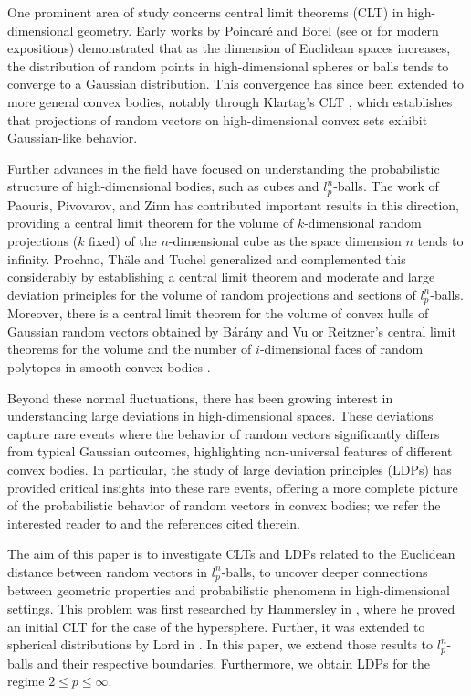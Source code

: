\documentclass[10pt]{amsart}
\newcounter{theor}
\numberwithin{equation}{section}
\begin{document}
One prominent area of study concerns central limit theorems (CLT) in high-dimensional geometry. Early works by Poincar\'e and Borel (see \cite{DF} or \cite{St} for modern expositions) demonstrated that as the dimension of Euclidean spaces increases, the distribution of random points in high-dimensional spheres or balls tends to converge to a Gaussian distribution. This convergence has since been extended to more general convex bodies, notably through Klartag's CLT \cite{K,K2}, which establishes that projections of random vectors on high-dimensional convex sets exhibit Gaussian-like behavior.

Further advances in the field have focused on understanding the probabilistic structure of high-dimensional bodies, such as cubes and  $l_p^n$-balls. The work of Paouris, Pivovarov, and Zinn \cite{PPZ} has contributed important results in this direction, providing a central limit theorem for the volume of $k$-dimensional random projections ($k$ fixed) of the $n$-dimensional cube as the space dimension $n$ tends to infinity. Prochno, Th\"ale and Tuchel \cite{PTT} generalized and complemented this considerably by establishing a central limit theorem and moderate and large deviation principles for the volume of random projections and sections of $l_p^n$-balls. Moreover, there is a central limit theorem for the volume of convex hulls of Gaussian random vectors obtained by B\'ar\'any and Vu \cite{VB} or Reitzner's central limit theorems for the volume and the number of $i$-dimensional faces of random polytopes in smooth convex bodies \cite{R}.

Beyond these normal fluctuations, there has been growing interest in understanding large deviations in high-dimensional spaces. These deviations capture rare events where the behavior of random vectors significantly differs from typical Gaussian outcomes, highlighting non-universal features of different convex bodies. In particular, the study of large deviation principles (LDPs) has provided critical insights into these rare events, offering a more complete picture of the probabilistic behavior of random vectors in convex bodies; we refer the interested reader to \cite{P} and the references cited therein. 


The aim of this paper is to investigate CLTs and LDPs related to the Euclidean distance between random vectors in $l_p^n$-balls, to uncover deeper connections between geometric properties and probabilistic phenomena in high-dimensional settings. This problem was first researched by Hammersley in \cite{H}, where he proved an initial CLT for the case of the hypersphere. Further, it was extended to spherical distributions by Lord in \cite{L}. In this paper, we extend those results to $l_p^n$-balls and their respective boundaries. Furthermore, we obtain LDPs for the regime $2\leq p \leq \infty$. 
\end{document}
